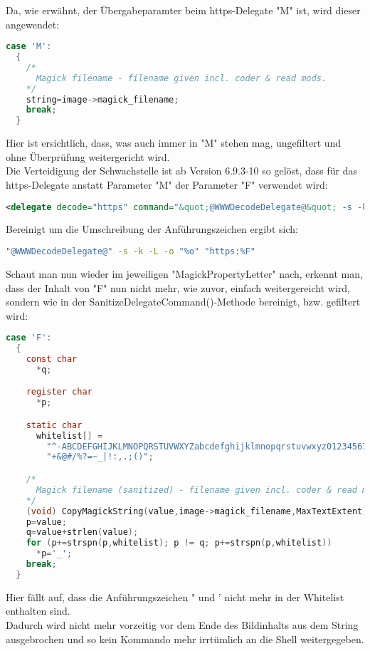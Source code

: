 Da, wie erwähnt, der Übergabeparamter beim https-Delegate "M" ist, wird dieser angewendet:\\

\begin{lstlisting}[firstnumber=2627, language=C, caption=magick/property.c Ungefilterte Weitergabe M-Parameter,label={lst:lstlisting}]
  case 'M':
  {
    /*
      Magick filename - filename given incl. coder & read mods.
    */
    string=image->magick_filename;
    break;
  }
\end{lstlisting}
\vspace{5mm}

Hier ist ersichtlich, dass, was auch immer in "M" stehen mag, ungefiltert und ohne Überprüfung weitergericht wird.\\

Die Verteidigung der Schwachstelle ist ab Version 6.9.3-10 so gelöst, dass für das https-Delegate anstatt Parameter "M" der Parameter "F" verwendet wird:\\

\begin{lstlisting}[firstnumber=91, language=XML, caption=config/delegates.xml.in https-Delegate 6.9.3-10,label={lst:lstlisting}]
  <delegate decode="https" command="&quot;@WWWDecodeDelegate@&quot; -s -k -L -o &quot;%o&quot; &quot;https:%F&quot;"/>
\end{lstlisting}
\vspace{5mm}

Bereinigt um die Umschreibung der Anführungszeichen ergibt sich:\\

\begin{lstlisting}[firstnumber=1, language=Bash, caption=Aufgelöster https-Delegate-Befehl 6.9.3-10,label={lst:lstlisting}]
"@WWWDecodeDelegate@" -s -k -L -o "%o" "https:%F"
\end{lstlisting}
\vspace{5mm}

Schaut man nun wieder im jeweiligen "MagickPropertyLetter" nach, erkennt man, dass der Inhalt von "F" nun nicht mehr, wie zuvor, einfach weitergereicht wird, sondern wie in der SanitizeDelegateCommand()-Methode bereinigt, bzw. gefiltert wird:\\

\begin{lstlisting}[firstnumber=2610, language=C, caption=magick/property.c Gefilterte Wietergabe F-Parameter,label={lst:lstlisting}]
  case 'F':
  {
    const char
      *q;

    register char
      *p;

    static char
      whitelist[] =
        "^-ABCDEFGHIJKLMNOPQRSTUVWXYZabcdefghijklmnopqrstuvwxyz0123456789"
        "+&@#/%?=~_|!:,.;()";

    /*
      Magick filename (sanitized) - filename given incl. coder & read mods.
    */
    (void) CopyMagickString(value,image->magick_filename,MaxTextExtent);
    p=value;
    q=value+strlen(value);
    for (p+=strspn(p,whitelist); p != q; p+=strspn(p,whitelist))
      *p='_';
    break;
  }
\end{lstlisting}
\vspace{5mm}

Hier fällt auf, dass die Anführungszeichen " und ' nicht mehr in der Whitelist enthalten sind.\\

Dadurch wird nicht mehr vorzeitig vor dem Ende des Bildinhalts aus dem String ausgebrochen und so kein Kommando mehr irrtümlich an die Shell weitergegeben.
